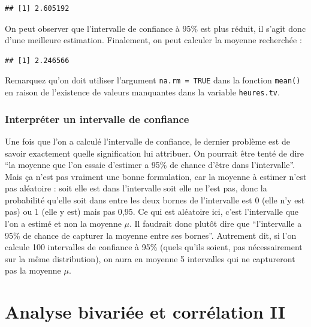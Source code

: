 \documentclass[
  french,
]{book}
\newenvironment{Shaded}{\begin{snugshade}}{\end{snugshade}}
\newcommand{\AttributeTok}[1]{\textcolor[rgb]{0.77,0.63,0.00}{#1}}
\newcommand{\ConstantTok}[1]{\textcolor[rgb]{0.00,0.00,0.00}{#1}}
\newcommand{\FunctionTok}[1]{\textcolor[rgb]{0.00,0.00,0.00}{#1}}
\newcommand{\NormalTok}[1]{#1}
\newcommand{\SpecialCharTok}[1]{\textcolor[rgb]{0.00,0.00,0.00}{#1}}
\begin{document}
\begin{verbatim}
## [1] 2.605192
\end{verbatim}

On peut observer que l'intervalle de confiance à 95\% est plus réduit, il s'agit donc d'une meilleure estimation. Finalement, on peut calculer la moyenne recherchée :

\begin{Shaded}
\end{Shaded}

\begin{verbatim}
## [1] 2.246566
\end{verbatim}

Remarquez qu'on doit utiliser l'argument \texttt{na.rm\ =\ TRUE} dans la fonction \texttt{mean()} en raison de l'existence de valeurs manquantes dans la variable \texttt{heures.tv}.

\hypertarget{interpruxe9ter-un-intervalle-de-confiance}{%
\subsection{Interpréter un intervalle de confiance}\label{interpruxe9ter-un-intervalle-de-confiance}}

Une fois que l'on a calculé l'intervalle de confiance, le dernier problème est de savoir exactement quelle signification lui attribuer. On pourrait être tenté de dire ``la moyenne que l'on essaie d'estimer a 95\% de chance d'être dans l'intervalle''. Mais ça n'est pas vraiment une bonne formulation, car la moyenne à estimer n'est pas aléatoire : soit elle est dans l'intervalle soit elle ne l'est pas, donc la probabilité qu'elle soit dans entre les deux bornes de l'intervalle est 0 (elle n'y est pas) ou 1 (elle y est) mais pas 0,95. Ce qui est aléatoire ici, c'est l'intervalle que l'on a estimé et non la moyenne \(\mu\). Il faudrait donc plutôt dire que ``l'intervalle a 95\% de chance de capturer la moyenne entre ses bornes''. Autrement dit, si l'on calcule 100 intervalles de confiance à 95\% (quels qu'ils soient, pas nécessairement sur la même distribution), on aura en moyenne 5 intervalles qui ne captureront pas la moyenne \(\mu\).

\hypertarget{analyse-bivariuxe9e-et-corruxe9lation-ii}{%
\chapter{Analyse bivariée et corrélation II}\label{analyse-bivariuxe9e-et-corruxe9lation-ii}}
\end{document}
